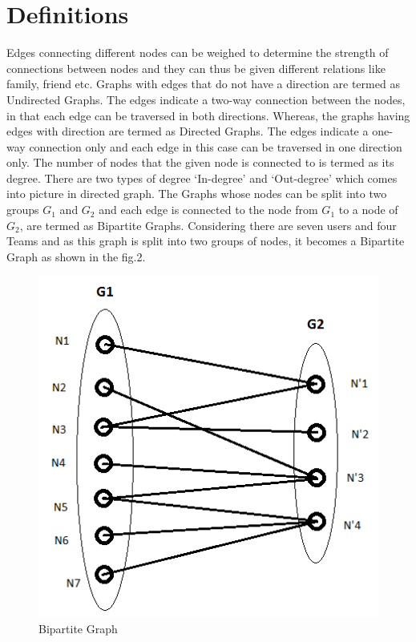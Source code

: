 \documentclass{article}
\begin{document}
\section{Definitions}
Edges connecting different nodes can be weighed to determine the strength of connections between nodes and they can thus be given different relations like family, friend etc.
\newline
Graphs with edges that do not have a direction are termed as Undirected Graphs. The edges indicate a two-way connection between the nodes, in that each edge can be traversed in both directions. 
\newline
Whereas, the graphs having edges with direction are termed as Directed Graphs. The edges indicate a one-way connection only and each edge in this case can be traversed in one direction only.
\newline
The number of nodes that the given node is connected to is termed as its degree. There are two types of degree ‘In-degree’ and ‘Out-degree’ which comes into picture in directed graph.
\newline
The Graphs whose nodes can be split into two groups \({G_1}\) and \({G_2}\) and each edge is connected to the node from \({G_1}\) to a node of \({G_2}\), are termed as Bipartite Graphs.
Considering there are seven users and four Teams and as this graph is split into two groups of nodes, it becomes a Bipartite Graph as shown in the fig.2.
\begin{figure}[ht]
\centering
\includegraphics[scale=0.6]{bipar1.png}
\caption{Bipartite Graph}
\end{figure}
\newpage
\end{document}
